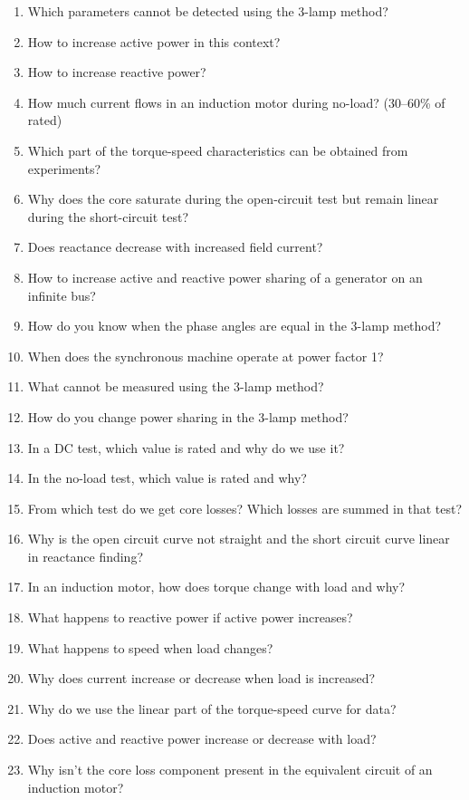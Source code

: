 \documentclass[12pt,a4paper]{article}
\begin{document}
\begin{enumerate}
		\item Which parameters cannot be detected using the 3-lamp method?
		\item How to increase active power in this context?
		\item How to increase reactive power?
		\item How much current flows in an induction motor during no-load? (30–60\% of rated)
		\item Which part of the torque-speed characteristics can be obtained from experiments?
		\item Why does the core saturate during the open-circuit test but remain linear during the short-circuit test?
		\item Does reactance decrease with increased field current?
		\item How to increase active and reactive power sharing of a generator on an infinite bus?
		\item How do you know when the phase angles are equal in the 3-lamp method?
		\item When does the synchronous machine operate at power factor 1?
		\item What cannot be measured using the 3-lamp method?
		\item How do you change power sharing in the 3-lamp method?
		\item In a DC test, which value is rated and why do we use it?
		\item In the no-load test, which value is rated and why?
		\item From which test do we get core losses? Which losses are summed in that test?
		\item Why is the open circuit curve not straight and the short circuit curve linear in reactance finding?
		\item In an induction motor, how does torque change with load and why?
		\item What happens to reactive power if active power increases?
		\item What happens to speed when load changes?
		\item Why does current increase or decrease when load is increased?
		\item Why do we use the linear part of the torque-speed curve for data?
		\item Does active and reactive power increase or decrease with load?
		\item Why isn't the core loss component present in the equivalent circuit of an induction motor?

\end{enumerate}
\end{document}
